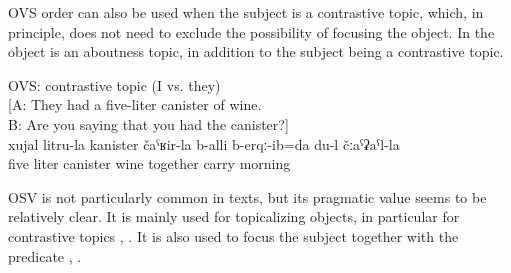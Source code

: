 OVS order can also be used when the subject is a contrastive topic, which, in principle, does not need to exclude the possibility of focusing the object. In  the object is an aboutness topic, in addition to the subject being a contrastive topic.
%
\begin{exe}
	\ex	OVS: contrastive topic (I vs. they)\\\label{ex:I had taken the five-litre canister of wine in the morning OVS}%
		[A: They had a five-liter canister of wine.\\\hphantom{[}B: Are you saying that you had the canister?]\\
	\gll	xujal	litru-la	kanister	čaˁʁir-la	b-alli	b-erqː-ib=da	du-l	čːaˁʡaˁl-la\\
		five	liter	canister	wine	\tsc{n-}together	carry		morning\\
	\glt	{}
\end{exe}

OSV  is not particularly common in texts, but its pragmatic value seems to be relatively clear. It is mainly used for topicalizing objects, in particular for contrastive topics , . It is also used to focus the subject together with the predicate , \refex{ex:Well, I know her; [that Salikhat who married Rasul}.

